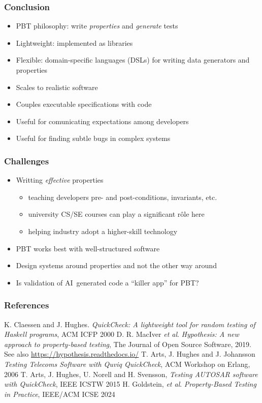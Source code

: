 \documentclass{beamer}
\begin{document}
\begin{frame}[allowframebreaks]
  \frametitle{Conclusion}

\begin{itemize}
\item PBT philosophy: write \emph{properties} and \emph{generate} tests
\item Lightweight: implemented as libraries
\item Flexible: domain-specific languages (DSLs) for writing
    data generators and properties
 \item Scales to realistic software
    
\item Couples executable specifications with code
\item Useful for comunicating expectations among developers
\item Useful for finding subtle bugs in complex systems 
\end{itemize}
\end{frame}

\begin{frame}
  \frametitle{Challenges}
\begin{itemize}
\item Writting \emph{effective} properties  
  \begin{itemize}
  \item teaching developers pre- and post-conditions, invariants, etc.
  \item university CS/SE courses can play a significant rôle here
  \item helping industry adopt a higher-skill technology 
  \end{itemize}
\item PBT works best with well-structured software
\item Design systems around properties and not the other way around
\item Is validation of AI~generated code a ``killer app''
  for PBT? 
\end{itemize}
\end{frame}

\begin{frame}
  \frametitle{References}

  \begin{thebibliography}{9}
   K. Claessen and J. Hughes.
    \emph{QuickCheck: A lightweight tool for random testing of Haskell
      programs}, ACM ICFP 2000
   D. R. MacIver \emph{et al}.
    \emph{Hypothesis: A new approach to property-based testing},
    The Journal of Open Source Software, 2019.
    See also \url{https://hypothesis.readthedocs.io/}
   T. Arts, J. Hughes and J. Johansson
    \emph{Testing Telecoms Software with Quviq QuickCheck},
    ACM Workshop on Erlang, 2006
   T. Arts, J. Hughes, U. Norell and H. Svensson,
    \emph{Testing AUTOSAR software with QuickCheck}, IEEE ICSTW 2015
   H. Goldstein, \emph{et al}. \emph{Property-Based
      Testing in Practice}, IEEE/ACM ICSE 2024
  \end{thebibliography}


\end{frame}
\end{document}
